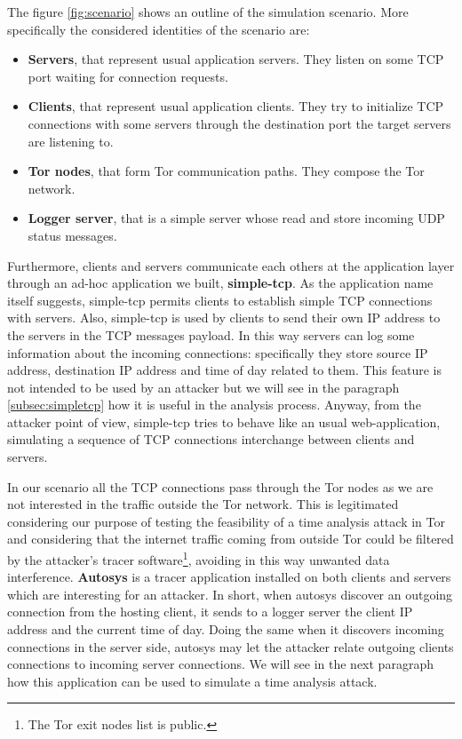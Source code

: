The figure \ref{fig:scenario} shows an outline of the simulation
scenario. More specifically the considered identities of the scenario are:
\begin{itemize} 
	\item \textbf{Servers}, that represent usual application servers.
They listen on some TCP port waiting for connection requests.
	\item \textbf{Clients}, that represent usual application clients.
They try to initialize TCP connections with some servers through the
destination port the target servers are listening to.
	\item \textbf{Tor nodes}, that form Tor communication paths. They
compose the Tor network.
	\item \textbf{Logger server}, that is a simple server whose read
and store incoming UDP status messages.
\end{itemize}

Furthermore, clients and servers communicate each others at the application layer
through an ad-hoc application we built, \textbf{simple-tcp}. As the
application name itself suggests, simple-tcp permits clients to
establish simple TCP connections with servers. Also, simple-tcp is used
by clients to send their own IP address to the servers in the TCP
messages payload.
In this way servers can log some information about the incoming connections:
specifically they store source IP address,
destination IP address and time of day related to them. 
This feature is not intended to be used by an attacker but
we will see in the paragraph \ref{subsec:simpletcp} how
it is useful in the analysis process. Anyway, from the attacker point of
view, simple-tcp tries to behave like an usual web-application,
simulating a sequence of TCP connections interchange between clients and
servers. 

In our scenario all the TCP connections pass through the Tor
nodes as we are not interested in the traffic outside the Tor network. 
This is legitimated considering our purpose of testing the feasibility of a time analysis
attack in Tor and considering that the internet traffic coming from
outside Tor could be filtered by the attacker's tracer
software\footnote{The Tor exit nodes list is public\cite{toroverview}.}, avoiding in this
way unwanted data interference.
\textbf{Autosys} is a tracer application installed on both clients and
servers which are interesting for an attacker.  
In short, when autosys discover an outgoing connection from the
hosting client, it sends to a logger server the client IP address and
the current time of day. Doing the same when it discovers incoming
connections in the server side, autosys may let the attacker relate outgoing
clients connections 
 to incoming server connections. We will see in the next
paragraph how this application can be used to simulate a time analysis
attack.
